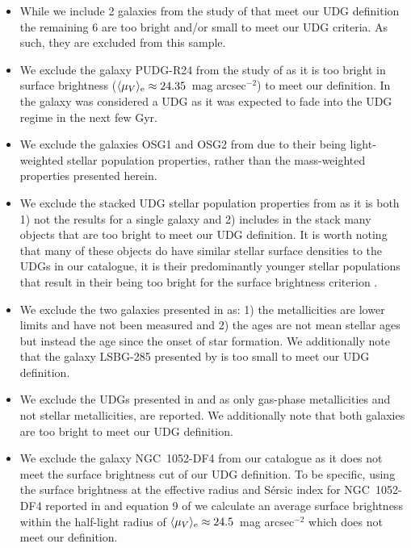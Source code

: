 \begin{itemize}
    \item While we include 2 galaxies from the study of \citet{Chilingarian2019} that meet our UDG definition the remaining 6 are too bright and/or small to meet our UDG criteria. As such, they are excluded from this sample. 
    \item We exclude the galaxy PUDG-R24 from the study of \citet{Gannon2022} as it is too bright in surface brightness ($\langle \mu_{V} \rangle_{\rm e} \approx 24.35$~mag arcsec$^{-2}$) to meet our definition. In \citet{Gannon2022} the galaxy was considered a UDG as it was expected to fade into the UDG regime in the next few Gyr. 
    \item We exclude the galaxies OSG1 and OSG2 from \citet{RuizLara2018} due to their being light-weighted stellar population properties, rather than the mass-weighted properties presented herein. 
    \item We exclude the stacked UDG stellar population properties from \citet{Rong2020} as it is both 1) not the results for a single galaxy and 2) includes in the stack many objects that are too bright to meet our UDG definition. It is worth noting that many of these objects do have similar stellar surface densities to the UDGs in our catalogue, it is their predominantly younger stellar populations that result in their being too bright for the surface brightness criterion \citep{Rong2020}.
    \item We exclude the two galaxies presented in \citet{Greco2018} as: 1) the metallicities are lower limits and have not been measured and 2) the ages are not mean stellar ages but instead the age since the onset of star formation. We additionally note that the galaxy LSBG-285 presented by \citet{Greco2018} is too small to meet our UDG definition.
    \item  We exclude the UDGs presented in \citet{Trujillo2017} and \citet{Bellazzini2017} as only gas-phase metallicities and not stellar metallicities, are reported. We additionally note that both \citet{Bellazzini2017} galaxies are too bright to meet our UDG definition. 
    \item We exclude the galaxy NGC~1052-DF4 \citep{vanDokkum2019} from our catalogue as it does not meet the surface brightness cut of our UDG definition. To be specific, using the surface brightness at the effective radius and S\'ersic index for NGC~1052-DF4 reported in \citet[25.1 mag arcsec$^{-2}$ and 0.79 respectively]{Cohen2018} and equation 9 of \citet{Graham2005} we calculate an average surface brightness within the half-light radius of $\langle \mu_{V} \rangle_{\rm e} \approx 24.5$~mag arcsec$^{-2}$ which does not meet our definition. 
\end{itemize}

